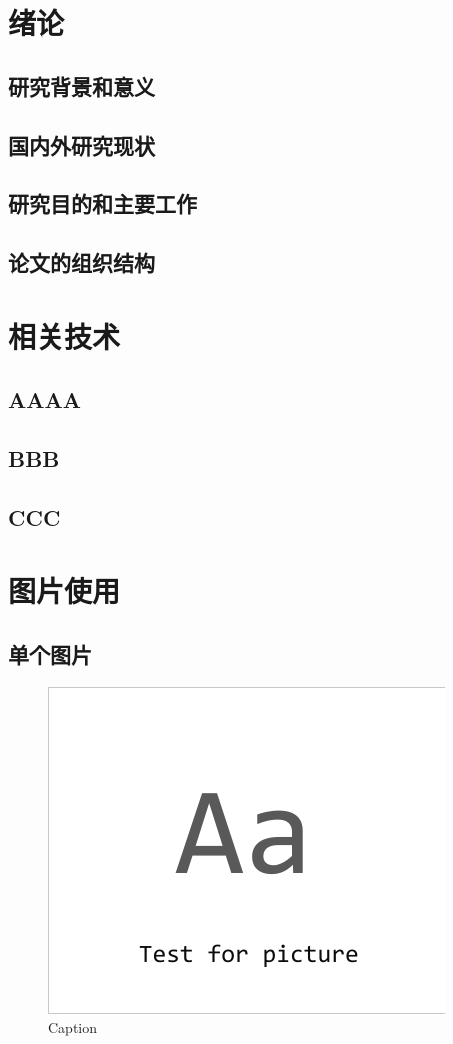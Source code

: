 \cleardoublepage
\chapter{绪论}
\thispagestyle{fancy}  %
\section{研究背景和意义}

\section{国内外研究现状}


\newpage
\section{研究目的和主要工作}

\newpage
\section{论文的组织结构}


\chapter{相关技术}
\thispagestyle{fancy}  %
\section{AAAA}

\section{BBB}

\section{CCC}


\chapter{图片使用}
\thispagestyle{fancy}  %
\section{单个图片}
\begin{figure}[h]
    \centering
    \includegraphics[width=0.5\linewidth]{images/testforpic.pdf}
    \caption{Caption}
    \label{fig:enter-label}
\end{figure}


